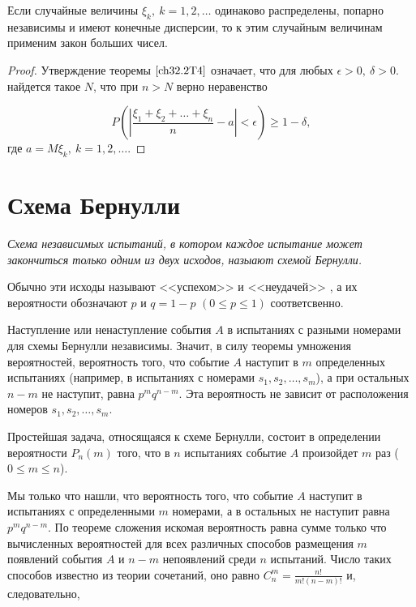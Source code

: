 \begin{thm} \label{ch32.2T4}
Если случайные величины $\xi_k, \: k = 1,2,\ldots$ одинаково распределены, попарно независимы и имеют конечные дисперсии, то к этим случайным величинам применим закон больших чисел.
\end{thm}

\begin{proof}
Утверждение теоремы $\eqref{ch32.2T4}$ означает, что для любых $\epsilon > 0, \: \delta > 0$. найдется такое $N$, что при $n > N$ верно неравенство

\begin{equation} \label{ch32.2eq6}
P \left( \left| \frac{\xi_1 + \xi_2 + \ldots + \xi_n}{n} - a \right| < \epsilon \right) \ge 1 - \delta,
\end{equation}
где $a = M  \xi_k, \: k = 1, 2, \ldots$.
\end{proof}

\section{Схема Бернулли}

\textit{Схема независимых испытаний, в котором каждое испытание может закончиться только одним из двух исходов, назыают схемой Бернулли.}

Обычно эти исходы называют <<успехом>> и <<неудачей>> , а их вероятности обозначают $p$ и $q = 1 - p$ $(0 \le p \le 1)$ соответсвенно.

Наступление или ненаступление события $A$ в испытаниях с разными номерами для схемы Бернулли независимы. Значит, в силу теоремы умножения вероятностей, вероятность того, что событие $A$ наступит в $m$ определенных испытаниях (например, в испытаниях с номерами $s_1, s_2, \ldots, s_m$), а при остальных $n - m$ не наступит, равна $p^mq^{n - m}$. Эта вероятность не зависит от  расположения номеров $s_1, s_2, \ldots, s_m$.

Простейшая задача, относящаяся к схеме Бернулли, состоит в определении вероятности $P_n(m)$ того, что в $n$ испытаниях событие $A$ произойдет $m$ раз ($0 \le m \le n$).

Мы только что нашли, что вероятность того, что событие $A$ наступит в испытаниях с определенными $m$ номерами, а в остальных не наступит равна $p^mq^{n - m}$. По теореме сложения искомая вероятность равна сумме только что вычисленных вероятностей для всех различных способов размещения $m$ появлений события $A$ и $n - m$ непоявлений среди $n$ испытаний. Число таких способов известно из теории сочетаний, оно равно 	$C_n^m = \frac{n!}{m!(n - m)!}$ и, следовательно,
 
